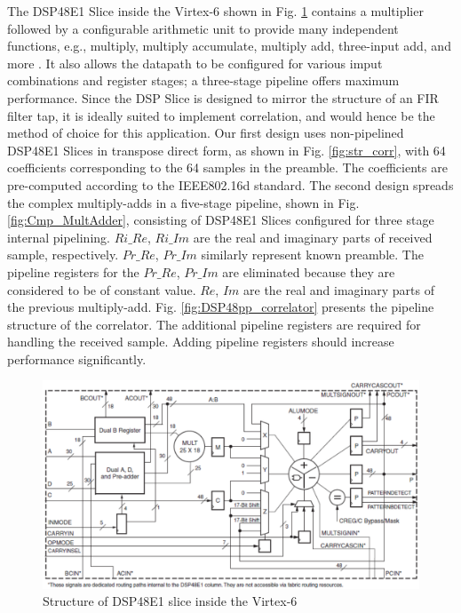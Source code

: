 The DSP48E1 Slice inside the Virtex-6 shown in Fig. \ref{fig:DSP48E1} contains a multiplier followed by a configurable arithmetic unit to provide many independent functions, e.g., multiply, multiply accumulate, multiply add, three-input add, and more \cite{Xilinx2011}.
It also allows the datapath to be configured for various imput combinations and register stages; a three-stage pipeline offers maximum performance.
Since the DSP Slice is designed to mirror the structure of an FIR filter tap, it is ideally suited to implement correlation, and would hence be the method of choice for this application. 
Our first design uses non-pipelined DSP48E1 Slices in transpose direct form, as shown in Fig. \ref{fig:str_corr}, with 64 coefficients corresponding to the 64 samples in the preamble. 
The coefficients are pre-computed according to the IEEE802.16d standard. 
The second design spreads the complex multiply-adds in a five-stage pipeline, shown in Fig. \ref{fig:Cmp_MultAdder}, consisting of DSP48E1 Slices configured for three stage internal pipelining.  
$Ri\_Re$, $Ri\_Im$ are the real and imaginary parts of received sample, respectively. 
$Pr\_Re$, $Pr\_Im$ similarly represent known preamble. 
The pipeline registers for the $Pr\_Re$, $Pr\_Im$ are eliminated because they are considered to be of constant value. 
$Re$, $Im$ are the real and imaginary parts of the previous multiply-add. 
Fig. \ref{fig:DSP48pp_correlator} presents the pipeline structure of the correlator. 
The additional pipeline registers are required for handling the received sample.
Adding pipeline registers should increase performance significantly.
\begin{figure}
	\centerline{\includegraphics [width=0.9\columnwidth] {figures/DSP48E1.pdf} }
	\caption{Structure of DSP48E1 slice inside the Virtex-6 \cite{Xilinx2011}}
	\label{fig:DSP48E1}
\end{figure}

